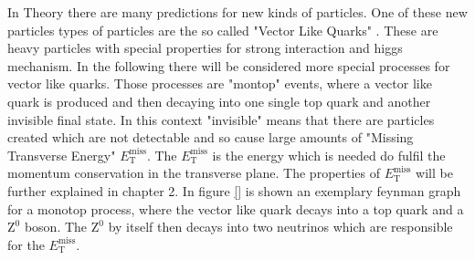 In Theory there are many predictions for new kinds of particles.
One of these new particles types of particles are the so called "Vector Like Quarks" .
These are heavy particles with special properties for strong interaction and higgs mechanism.
In the following there will be considered more special processes for vector like quarks.
Those processes are "montop" events, where a vector like quark is produced and then decaying into one single top quark and another invisible final state.
In this context "invisible" means that there are particles created which are not detectable and so cause large amounts of "Missing Transverse Energy" $E_{\text{T}}^{\text{miss}}$.
The $E_{\text{T}}^{\text{miss}}$ is the energy which is needed do fulfil the momentum conservation in the transverse plane.
The properties of $E_{\text{T}}^{\text{miss}}$ will be further explained in chapter 2.
In figure \ref{} is shown an exemplary feynman graph for a monotop process, where the vector like quark decays into a top quark and a $\mathrm{Z^0}$ boson.
The $\mathrm{Z^0}$ by itself then decays into two neutrinos which are responsible for the  $E_{\text{T}}^{\text{miss}}$.